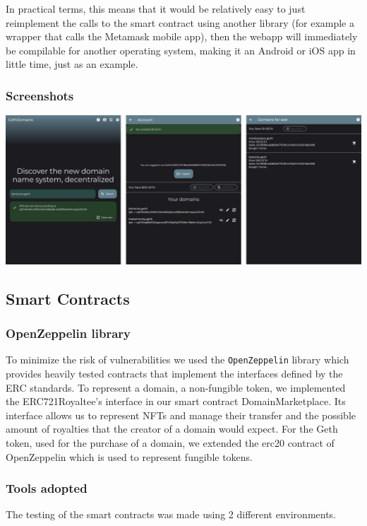 \documentclass[main.tex]{subfiles}
\begin{document}
In practical terms, this means that it would be relatively easy to just reimplement the calls to the smart contract using another library (for example a wrapper that calls the Metamask mobile app), then the webapp will immediately be compilable for another operating system, making it an Android or iOS app in little time, just as an example.

\subsubsection{Screenshots}
\includegraphics[width=\textwidth]{figures/webapp_screenshot_carousel.png}

\subsection{Smart Contracts}

\subsubsection{OpenZeppelin library}
To minimize the risk of vulnerabilities we used the \texttt{OpenZeppelin} library which provides heavily tested contracts that implement the interfaces defined by the ERC standards. To represent a domain, a non-fungible token, we implemented the ERC721Royaltee's interface in our smart contract DomainMarketplace. Its interface allows us to represent NFTs and manage their transfer and the possible amount of royalties that the creator of a domain would expect. For the  Geth token, used for the purchase of a domain, we extended the erc20 contract of OpenZeppelin which is used to represent fungible tokens.

\subsubsection{Tools adopted}
The testing of the smart contracts was made using 2 different environments.
\end{document}
